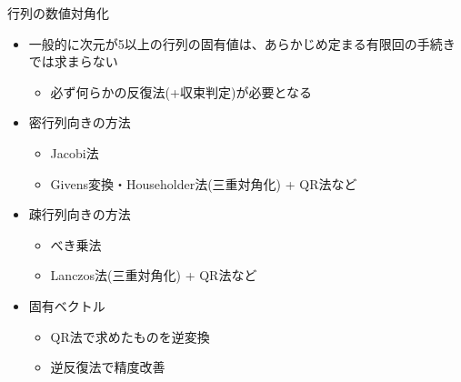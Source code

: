 \begin{frame}[t,fragile]{行列の数値対角化}
  \begin{itemize}
  \item 一般的に次元が5以上の行列の固有値は、あらかじめ定まる有限回の手続きでは求まらない
    \begin{itemize}
    \item 必ず何らかの反復法(+収束判定)が必要となる
    \end{itemize}
  \item 密行列向きの方法
    \begin{itemize}
    \item Jacobi法
    \item Givens変換・Householder法(三重対角化) + QR法など
    \end{itemize}
  \item 疎行列向きの方法
    \begin{itemize}
    \item べき乗法
    \item Lanczos法(三重対角化) + QR法など
    \end{itemize}
  \item 固有ベクトル
    \begin{itemize}
    \item QR法で求めたものを逆変換
    \item 逆反復法で精度改善
    \end{itemize}
  \end{itemize}
\end{frame}
